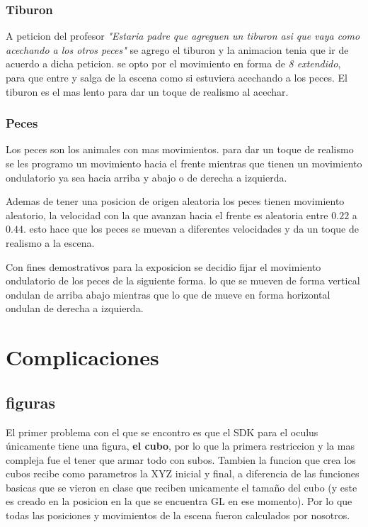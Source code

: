 \documentclass[10pt, a4paper, twocolumn]{article}
\begin{document}
\subsubsection{Tiburon}
A peticion del profesor \textit{"Estaria padre que agreguen un tiburon asi que vaya como acechando a los otros peces"} se agrego el tiburon y la animacion tenia que ir de acuerdo a dicha peticion. se opto por el movimiento en forma de \textit{8 extendido}, para que entre y salga de la escena como si estuviera acechando a los peces. El tiburon es el mas lento para dar un toque de realismo al acechar.

 \subsubsection{Peces}
Los peces son los animales con mas movimientos. para dar un toque de realismo se les programo un movimiento hacia el frente mientras que tienen un movimiento ondulatorio ya sea hacia arriba y abajo o de derecha a izquierda. 
 
Ademas de tener una posicion de origen aleatoria los peces tienen movimiento aleatorio, la velocidad con la que avanzan hacia el frente es aleatoria entre $0.22$ a $0.44$. esto hace que los peces se muevan a diferentes velocidades y da un toque de realismo a la escena.

Con fines demostrativos para la exposicion se decidio fijar el movimiento ondulatorio de los peces de la siguiente forma. lo que se mueven de forma vertical ondulan de arriba abajo mientras que lo que de mueve en forma horizontal ondulan de derecha a izquierda. 

\section{Complicaciones}
\subsection{figuras}
El primer problema con el que se encontro es que el SDK para el oculus únicamente tiene una figura, \textbf{el cubo}, por lo que la primera restriccion y la mas compleja fue el tener que armar todo con subos. Tambien la funcion que crea los cubos recibe como parametros la XYZ inicial y final, a diferencia de las funciones basicas que se vieron en clase que reciben unicamente el tamaño del cubo (y este es creado en la posicion en la que se encuentra GL en ese momento). Por lo que todas las posiciones y movimientos de la escena fueron calculados por nosotros. 
\end{document}
